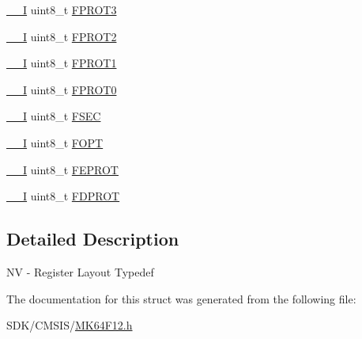 \begin{DoxyCompactItemize}
\item 
\mbox{\hyperlink{core__cm4_8h_af63697ed9952cc71e1225efe205f6cd3}{\+\_\+\+\_\+I}} uint8\+\_\+t \mbox{\hyperlink{group___v_r_e_f___peripheral___access___layer_gae95f76fe298558644b1a5c8acc1cdf3a}{F\+P\+R\+O\+T3}}
\item 
\mbox{\hyperlink{core__cm4_8h_af63697ed9952cc71e1225efe205f6cd3}{\+\_\+\+\_\+I}} uint8\+\_\+t \mbox{\hyperlink{group___v_r_e_f___peripheral___access___layer_gae87543688ebb5c30285916eaa270c014}{F\+P\+R\+O\+T2}}
\item 
\mbox{\hyperlink{core__cm4_8h_af63697ed9952cc71e1225efe205f6cd3}{\+\_\+\+\_\+I}} uint8\+\_\+t \mbox{\hyperlink{group___v_r_e_f___peripheral___access___layer_gae00ef9e85bce41b17b8c85e226bfeadb}{F\+P\+R\+O\+T1}}
\item 
\mbox{\hyperlink{core__cm4_8h_af63697ed9952cc71e1225efe205f6cd3}{\+\_\+\+\_\+I}} uint8\+\_\+t \mbox{\hyperlink{group___v_r_e_f___peripheral___access___layer_ga060054d1f5f54bb8a55d0eeb7cd8ae29}{F\+P\+R\+O\+T0}}
\item 
\mbox{\hyperlink{core__cm4_8h_af63697ed9952cc71e1225efe205f6cd3}{\+\_\+\+\_\+I}} uint8\+\_\+t \mbox{\hyperlink{group___v_r_e_f___peripheral___access___layer_ga9c289cf99054de8442c0847062613f18}{F\+S\+EC}}
\item 
\mbox{\hyperlink{core__cm4_8h_af63697ed9952cc71e1225efe205f6cd3}{\+\_\+\+\_\+I}} uint8\+\_\+t \mbox{\hyperlink{group___v_r_e_f___peripheral___access___layer_ga4a588e9f6d971bfa0ec727d08935c72e}{F\+O\+PT}}
\item 
\mbox{\hyperlink{core__cm4_8h_af63697ed9952cc71e1225efe205f6cd3}{\+\_\+\+\_\+I}} uint8\+\_\+t \mbox{\hyperlink{group___v_r_e_f___peripheral___access___layer_gab0f3424deecc64d5eb53e21c4b98290a}{F\+E\+P\+R\+OT}}
\item 
\mbox{\hyperlink{core__cm4_8h_af63697ed9952cc71e1225efe205f6cd3}{\+\_\+\+\_\+I}} uint8\+\_\+t \mbox{\hyperlink{group___v_r_e_f___peripheral___access___layer_gab8c86749c6e17e098c55c08aa58fb1c1}{F\+D\+P\+R\+OT}}
\end{DoxyCompactItemize}


\subsection{Detailed Description}
NV -\/ Register Layout Typedef 

The documentation for this struct was generated from the following file\+:\begin{DoxyCompactItemize}
\item 
S\+D\+K/\+C\+M\+S\+I\+S/\mbox{\hyperlink{_m_k64_f12_8h}{M\+K64\+F12.\+h}}\end{DoxyCompactItemize}
